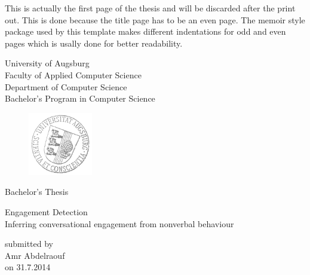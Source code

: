 \documentclass[12pt, a4paper, fleqn]{memoir}%
\begin{document}
\frontmatter

\pagestyle{empty}
This is actually the first page of the thesis and will be discarded after the print out. This is done because 
the title page has to be an even page. The memoir style package used by this template makes different indentations 
for odd and even pages which is usally done for better readability.  
\clearpage
\pagestyle{empty}
\rmfamily
\noindent
\begin{center}
University of Augsburg\\
Faculty of Applied Computer Science\\
Department of Computer Science\\
Bachelor's Program in Computer Science\\
\end{center}
\begin{figure}[h]
\centering
\includegraphics[width=0.25\textwidth]{logo.png}
\end{figure}
\vfill\vfill
\begin{center}
\Large
Bachelor's Thesis\\
\end{center}
\vspace{2.0em}
\begin{center}
\Large
\LARGE Engagement Detection\\ \vspace{10pt} 
\Large Inferring conversational engagement from nonverbal behaviour
\end{center}
\vspace{2.0em}
\begin{center}
    \normalsize
    submitted by\\
    \large
    Amr Abdelraouf\\
    \normalsize
    on 31.7.2014
\end{center}
\end{document}
